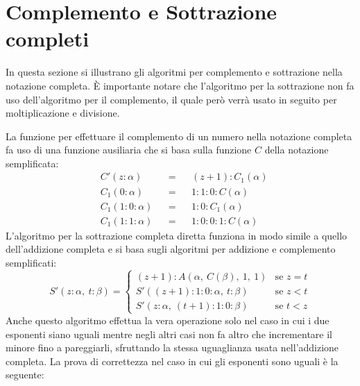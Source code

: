 \documentclass[Lau]{sapthesis}
\begin{document}
\section{Complemento e Sottrazione completi}
In questa sezione si illustrano gli algoritmi per complemento e sottrazione nella notazione completa. È importante notare che l'algoritmo per la sottrazione non fa uso dell'algoritmo per il complemento, il quale però verrà usato in seguito per moltiplicazione e divisione.

La funzione per effettuare il complemento di un numero nella notazione completa fa uso di una funzione ausiliaria che si basa sulla funzione $C$ della notazione semplificata:
\begin{align*}
&C'(z:\alpha) && = && (z+1):C_1(\alpha)\\
&C_1(0:\alpha) && = && 1:1:0:C(\alpha)\\
&C_1(1:0:\alpha) && = && 1:0:C_1(\alpha)\\
&C_1(1:1:\alpha) && = && 1:0:0:1:C(\alpha)
\end{align*}
L'algoritmo per la sottrazione completa diretta funziona in modo simile a quello dell'addizione completa e si basa sugli algoritmi per addizione e complemento semplificati:
\begin{equation*}
S'(z:\alpha, \ t:\beta) = \begin{cases}
(z+1):A(\alpha, \ C(\beta), \ 1, \ 1) & \text{se $z=t$}\\
S'((z+1):1:0:\alpha, \ t:\beta) & \text{se $z<t$}\\
S'(z:\alpha, \ (t+1):1:0:\beta) & \text{se $t<z$}
\end{cases}
\end{equation*}
Anche questo algoritmo effettua la vera operazione solo nel caso in cui i due esponenti siano uguali mentre negli altri casi non fa altro che incrementare il minore fino a pareggiarli, sfruttando la stessa uguaglianza usata nell'addizione completa. La prova di correttezza nel caso in cui gli esponenti sono uguali è la seguente:
\end{document}
